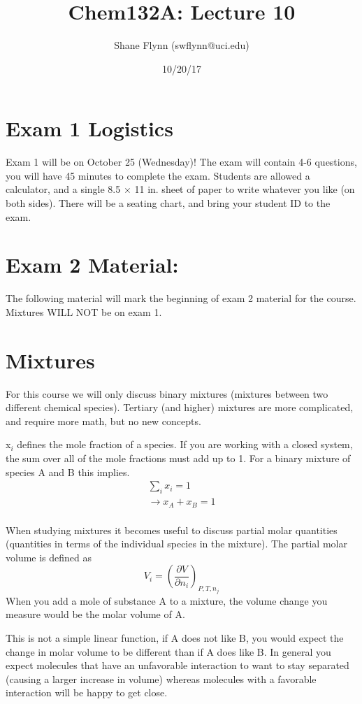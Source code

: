 \documentclass{article}
\title{Chem132A: Lecture 10}
\author{Shane Flynn (swflynn@uci.edu) }
\date{10/20/17}
\newcommand{\be}{\begin{equation}}
\newcommand{\ee}{\end{equation}}
\newcommand{\pd}{\partial}
\begin{document}
\maketitle

\section*{Exam 1 Logistics}
Exam 1 will be on October 25 (Wednesday)!
The exam will contain 4-6 questions, you will have 45 minutes to complete the exam.
Students are allowed a calculator, and a single 8.5 $\times$ 11 in. sheet of paper to write whatever you like (on both sides). 
There will be a seating chart, and bring your student ID to the exam.

\section*{Exam 2 Material:}
The following material will mark the beginning of exam 2 material for the course.
Mixtures WILL NOT be on exam 1. 

\section*{Mixtures}
For this course we will only discuss binary mixtures (mixtures between two different chemical species).
Tertiary (and higher) mixtures are more complicated, and require more math, but no new concepts. 

x$_i$ defines the mole fraction of a species. 
If you are working with a closed system, the sum over all of the mole fractions must add up to 1. 
For a binary mixture of species A and B this implies. 
\be
\begin{split}
\sum_i x_i = 1\\
\rightarrow x_A + x_B = 1\\
\end{split}
\ee

When studying mixtures it becomes useful to discuss partial molar quantities (quantities in terms of the individual species in the mixture). 
The partial molar volume is defined as
\be
V_i = \left(\frac{\pd V}{\pd n_i}\right)_{P,T, n_j}
\ee
When you add a mole of substance A to a mixture, the volume change you measure would be the molar volume of A. 

This is not a simple linear function, if A does not like B, you would expect the change in molar volume to be different than if A does like B. 
In general you expect molecules that have an unfavorable interaction to want to stay separated (causing a larger increase in volume) whereas molecules with a favorable interaction will be happy to get close. 
\end{document}
